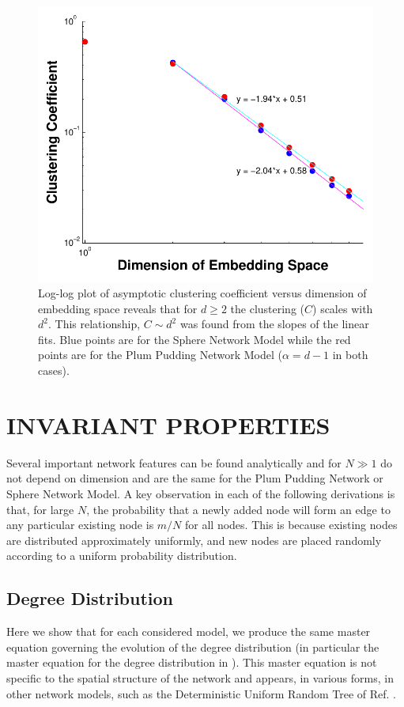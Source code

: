 \documentclass[aps,pre,reprint,superscriptaddress,amsmath,amssymb,nofootinbib]{revtex4-1}
\begin{document}
\begin{figure}
\includegraphics[width=\linewidth]{figures/figCvsD.pdf}
\caption{\label{clustdim}Log-log plot of asymptotic clustering coefficient versus dimension of embedding space reveals that for $d \geq 2$ the clustering ($C$) scales with $d^2$. This relationship, $C \sim d^2$ was found from the slopes of the linear fits. Blue points are for the Sphere Network Model while the red points are for the Plum Pudding Network Model ($\alpha = d-1$ in both cases).}
\end{figure}

\section{INVARIANT PROPERTIES}
Several important network features can be found analytically and for $N \gg 1$ do not depend on dimension and are the same for the Plum Pudding Network or Sphere Network Model.
A key observation in each of the following derivations is that, for large $N$, the probability that a newly added node will form an edge to any particular existing node is $m/N$ for all nodes.
This is because existing nodes are distributed approximately uniformly, and new nodes are placed randomly according to a uniform probability distribution.

\subsection{Degree Distribution}
\label{sub:degreedistribution}
Here we show that for each considered model, we produce the same master equation governing the evolution of the degree distribution (in particular the master equation for the degree distribution in \cite{ozik2004}).  
This master equation is not specific to the spatial structure of the network and appears, in various forms, in other network models, such as the Deterministic Uniform Random Tree of Ref. \cite{zhang2008topologies}.
\end{document}
